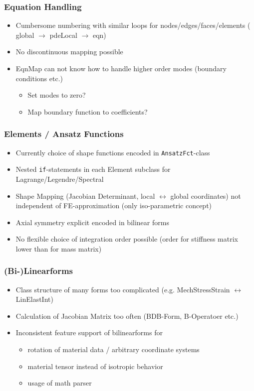 \subsubsection{Equation Handling}
\begin{itemize}
 \item Cumbersome numbering with similar loops for nodes/edges/faces/elements
 ( global $\rightarrow$ pdeLocal $\rightarrow$ eqn)
\item No discontinuous mapping possible
\item EqnMap can not know how to handle higher order modes (boundary conditions etc.)
\begin{itemize}
\item Set modes to zero?
\item Map boundary function to coefficients?
\end{itemize}
\end{itemize}

\subsubsection{Elements / Ansatz Functions}
\begin{itemize}
 \item Currently choice of shape functions encoded in {\tt AnsatzFct}-class
\item Nested \verb+if+-statements in each Element subclass for Lagrange/Legendre/Spectral
\item Shape Mapping (Jacobian Determinant, local $\leftrightarrow$ global coordinates) not independent of FE-approximation (only iso-parametric concept)
\item Axial symmetry explicit encoded in bilinear forms
\item No flexible choice of integration order possible (order for stiffness matrix lower than for mass matrix)
\end{itemize}

\subsubsection{(Bi-)Linearforms}
 \begin{itemize}
  \item Class structure of many forms too complicated (e.g. MechStressStrain $\leftrightarrow$ LinElastInt)
\item Calculation of Jacobian Matrix too often (BDB-Form, B-Operatoer etc.)
\item Inconsistent feature support of bilinearforms for 
\begin{itemize}
\item rotation of material data / arbitrary coordinate systems
\item material tensor instead of isotropic behavior
\item usage of math parser
\end{itemize}
 \end{itemize}

